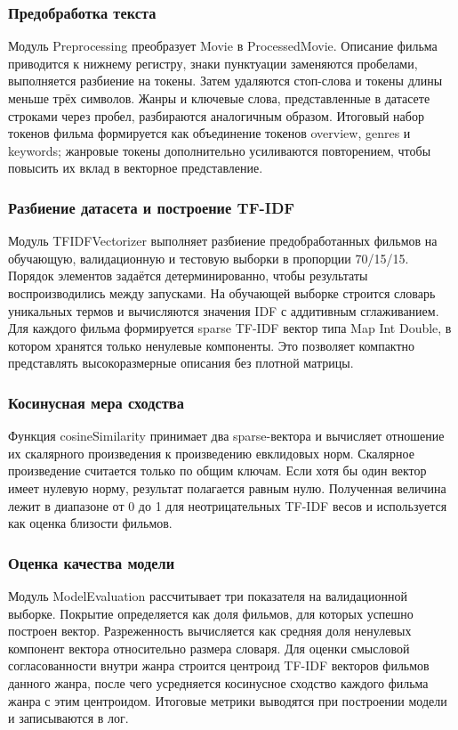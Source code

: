\documentclass[a4paper, 16pt]{article}
\begin{document}
\subsubsection{Предобработка текста}
Модуль Preprocessing преобразует Movie в ProcessedMovie. Описание фильма приводится к нижнему 
регистру, знаки пунктуации заменяются пробелами, выполняется разбиение на токены. Затем удаляются 
стоп-слова и токены длины меньше трёх символов. Жанры и ключевые слова, представленные в датасете строками 
через пробел, разбираются аналогичным образом. Итоговый набор токенов фильма формируется как объединение 
токенов overview, genres и keywords; жанровые токены дополнительно усиливаются повторением, чтобы повысить 
их вклад в векторное представление.

\subsubsection{Разбиение датасета и построение TF-IDF}
Модуль TFIDFVectorizer выполняет разбиение предобработанных фильмов на обучающую, валидационную и 
тестовую выборки в пропорции 70/15/15. Порядок элементов задаётся детерминированно, чтобы результаты 
воспроизводились между запусками. На обучающей выборке строится словарь уникальных термов и вычисляются 
значения IDF с аддитивным сглаживанием. Для каждого фильма формируется sparse TF-IDF вектор типа Map Int Double, 
в котором хранятся только ненулевые компоненты. Это позволяет компактно представлять высокоразмерные описания 
без плотной матрицы.

\subsubsection{Косинусная мера сходства}
Функция cosineSimilarity принимает два sparse-вектора и вычисляет отношение их скалярного произведения к 
произведению евклидовых норм. Скалярное произведение считается только по общим ключам. Если хотя бы один 
вектор имеет нулевую норму, результат полагается равным нулю. Полученная величина лежит в диапазоне от 0 до 1 
для неотрицательных TF-IDF весов и используется как оценка близости фильмов.

\subsubsection{Оценка качества модели}
Модуль ModelEvaluation рассчитывает три показателя на валидационной выборке. Покрытие определяется как доля 
фильмов, для которых успешно построен вектор. Разреженность вычисляется как средняя доля ненулевых компонент 
вектора относительно размера словаря. Для оценки смысловой согласованности внутри жанра строится центроид TF-IDF 
векторов фильмов данного жанра, после чего усредняется косинусное сходство каждого фильма жанра с этим центроидом. 
Итоговые метрики выводятся при построении модели и записываются в лог.
\end{document}
